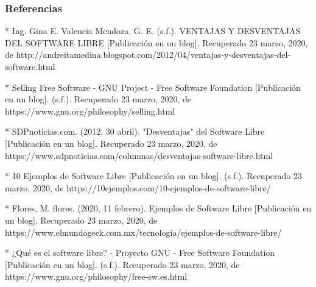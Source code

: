 \documentclass{beamer}
\begin{document}
    \begin{frame}
     \frametitle{Referencias}

       \tiny{* Ing. Gina E. Valencia Mendoza, G. E. (s.f.). VENTAJAS Y DESVENTAJAS DEL SOFTWARE LIBRE [Publicación en un blog]. Recuperado 23 marzo, 2020, de http://andreitamedina.blogspot.com/2012/04/ventajas-y-desventajas-del-software.html}\newline
      
       \tiny{* Selling Free Software - GNU Project - Free Software Foundation [Publicación en un blog]. (s.f.). Recuperado 23 marzo, 2020, de https://www.gnu.org/philosophy/selling.html}\newline
      
       \tiny{* SDPnoticias.com. (2012, 30 abril). "Desventajas" del Software Libre [Publicación en un blog]. Recuperado 23 marzo, 2020, de https://www.sdpnoticias.com/columnas/desventajas-software-libre.html}\newline
      
       \tiny{* 10 Ejemplos de Software Libre [Publicación en un blog]. (s.f.). Recuperado 23 marzo, 2020, de https://10ejemplos.com/10-ejemplos-de-software-libre/}\newline
      
       \tiny{* Flores, M. flores. (2020, 11 febrero). Ejemplos de Software Libre [Publicación en un blog]. Recuperado 23 marzo, 2020, de https://www.elmundogeek.com.mx/tecnologia/ejemplos-de-software-libre/}\newline
      
       \tiny{* ¿Qué es el software libre? - Proyecto GNU - Free Software Foundation [Publicación en un blog]. (s.f.). Recuperado 23 marzo, 2020, de https://www.gnu.org/philosophy/free-sw.es.html}

    \end{frame}

    


    
\end{document}
